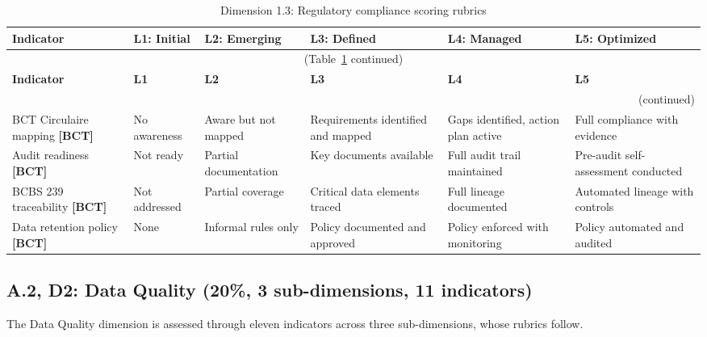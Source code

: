 \begin{center}
{\small
\begin{longtable}{|p{2.4cm}|p{2.0cm}|p{2.0cm}|p{2.2cm}|p{2.2cm}|p{2.2cm}|}
\caption{Dimension 1.3: Regulatory compliance scoring rubrics}\label{tab:d1-3}\\

\hline
\textbf{Indicator} & \textbf{L1: Initial} & \textbf{L2: Emerging} & \textbf{L3: Defined} & \textbf{L4: Managed} & \textbf{L5: Optimized} \\
\hline
\endfirsthead
\multicolumn{6}{c}{\small (Table~\ref{tab:d1-3} continued)} \\
\hline
\textbf{Indicator} & \textbf{L1} & \textbf{L2} & \textbf{L3} & \textbf{L4} & \textbf{L5} \\
\hline
\endhead
\hline
\multicolumn{6}{r}{\small (continued)} \\
\endfoot
\hline
\endlastfoot
BCT Circulaire mapping \textbf{[BCT]} &
  No awareness &
  Aware but not mapped &
  Requirements identified and mapped &
  Gaps identified, action plan active &
  Full compliance with evidence \\
\hline
Audit readiness \textbf{[BCT]} &
  Not ready &
  Partial documentation &
  Key documents available &
  Full audit trail maintained &
  Pre-audit self-assessment conducted \\
\hline
BCBS 239 traceability \textbf{[BCT]} &
  Not addressed &
  Partial coverage &
  Critical data elements traced &
  Full lineage documented &
  Automated lineage with controls \\
\hline
Data retention policy \textbf{[BCT]} &
  None &
  Informal rules only &
  Policy documented and approved &
  Policy enforced with monitoring &
  Policy automated and audited \\
\hline
\end{longtable}
}
\end{center}


\subsection*{A.2, D2: Data Quality (20\%, 3 sub-dimensions, 11 indicators)}

The Data Quality dimension is assessed through eleven indicators across three sub-dimensions, whose rubrics follow.

